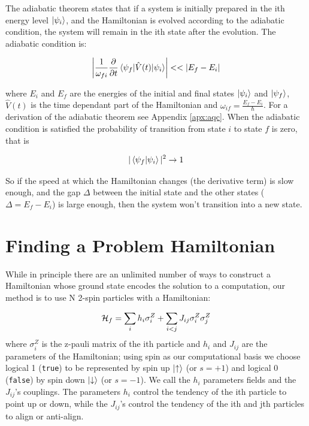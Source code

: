 The adiabatic theorem states that if a system is initially prepared in the ith energy level $\mathinner{|{\psi_i}\rangle}$, and the Hamiltonian is evolved according to the adiabatic condition, the system will remain in the ith state after the evolution.  The adiabatic condition is:

\begin{equation}
	\left | \frac{1}{\omega_{fi}}\frac{\partial}{\partial t} \mathinner{\langle{\psi_f | \hat{V}(t) | \psi_i}\rangle} \right | << |E_f - E_i|
\end{equation}

where $E_i$ and $E_f$ are the energies of the initial and final states $\mathinner{|{\psi_i}\rangle}$ and $\mathinner{|{\psi_f}\rangle}$, $\hat{V}(t)$ is the time dependant part of the Hamiltonian and $\omega_{if} = \frac{E_f - E_i}{\hbar}$.  For a derivation of the adiabatic theorem see Appendix \ref{apx:aqc}.\cite{zettili}  When the adiabatic condition is satisfied the probability of transition from state $i$ to state $f$ is zero, that is

\begin{equation}
	|\mathinner{\langle{\psi_f|\psi_i}\rangle}|^2 \rightarrow 1
\end{equation}

So if the speed at which the Hamiltonian changes (the derivative term) is slow enough, and the gap $\Delta$ between the initial state and the other states ($\Delta = E_f - E_i$) is large enough, then the system won't transition into a new state.  

\section{Finding a Problem Hamiltonian}
\label{sec:prob_ham}
While in principle there are an unlimited number of ways to construct a Hamiltonian whose ground state encodes the solution to a computation, our method is to use N 2-spin particles with a Hamiltonian:

\begin{equation}
	\label{eq:ham}
	\mathcal{H}_f = \sum_i h_i \sigma_i^Z + \sum_{i < j} J_{ij} \sigma_i^Z\sigma_j^Z 
\end{equation}
where $\sigma_i^Z$ is the z-pauli matrix of the ith particle and $h_i$ and $J_{ij}$ are the parameters of the Hamiltonian; using spin as our computational basis we choose logical 1 (\texttt{true}) to be represented by spin up $\mathinner{|{\uparrow}\rangle}$ (or $s = +1$) and logical 0 (\texttt{false}) by spin down $\mathinner{|{\downarrow}\rangle}$ (or $s = -1$).  We call the $h_i$ parameters fields and the $J_{ij}$'s couplings.  The parameters $h_i$ control the tendency of the ith particle to point up or down, while the $J_{ij}$'s control the tendency of the ith and jth particles to align or anti-align.


